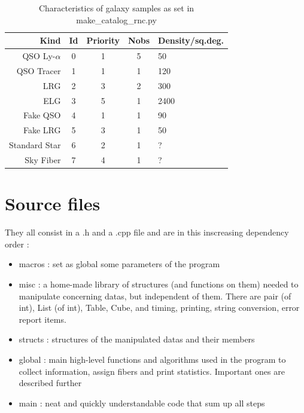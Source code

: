 \documentclass{extarticle}
\begin{document}
\begin{multicols}{2}
\begin{table}[H]\centering
	\begin{tabular}{rcccl} \hline
		Kind&Id&Priority&Nobs&Density/sq.deg.\\ \hline
		QSO Ly-$\alpha$& 0 & 1 & 5 &  50\\
		QSO Tracer & 1 & 1 & 1& 120\\
		LRG & 2 & 3 &2 & 300\\
		ELG & 3 & 5 & 1 & 2400\\
		Fake QSO & 4 & 1 & 1& 90\\
		Fake LRG & 5 & 3 & 1 & 50\\
		Standard Star & 6 & 2 & 1&  ?\\
		Sky Fiber & 7 & 4 & 1& ?\\ \hline
	\end{tabular}
	\caption{Characteristics of galaxy samples as set in make\_catalog\_rnc.py}\label{table:characteristics}
\end{table}


\section{Source files}
They all consist in a .h and a .cpp file and are in this inscreasing dependency order :
\begin{itemize} 
	\item macros : set as global some parameters of the program
	\item misc : a home-made library of structures (and functions on them) needed to manipulate concerning datas, but independent of them. There are pair (of int), List (of int), Table, Cube, and timing, printing, string conversion, error report items.
	\item structs : structures of the manipulated datas and their members
	\item global : main high-level functions and algorithms used in the program to collect information, assign fibers and print statistics. Important ones are described further
	\item main : neat and quickly understandable code that sum up all steps
\end{itemize} 


\end{multicols}
\end{document}

